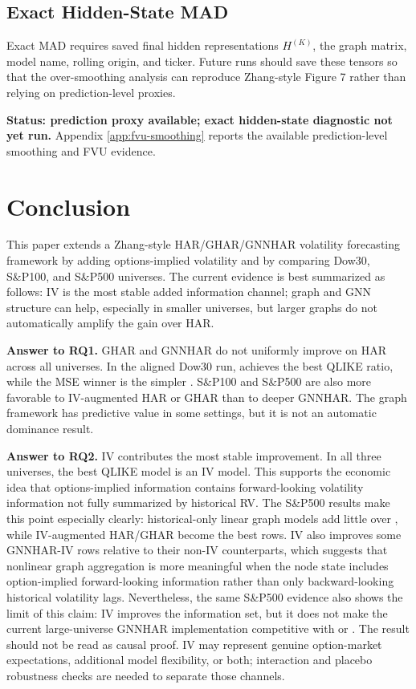 \documentclass[11pt,a4paper]{article}
\newcommand{\model}[1]{\texttt{\detokenize{#1}}}
\begin{document}
\subsection{Exact Hidden-State MAD}
\label{subsec:mad}

Exact MAD requires saved final hidden representations \(H^{(K)}\), the graph matrix, model name, rolling origin, and ticker.  Future runs should save these tensors so that the over-smoothing analysis can reproduce Zhang-style Figure 7 rather than relying on prediction-level proxies.

\textbf{Status: prediction proxy available; exact hidden-state diagnostic not yet run.}  Appendix \ref{app:fvu-smoothing} reports the available prediction-level smoothing and FVU evidence.

\section{Conclusion}
\label{sec:conclusion}

This paper extends a Zhang-style HAR/GHAR/GNNHAR volatility forecasting framework by adding options-implied volatility and by comparing Dow30, S\&P100, and S\&P500 universes.  The current evidence is best summarized as follows: IV is the most stable added information channel; graph and GNN structure can help, especially in smaller universes, but larger graphs do not automatically amplify the gain over HAR.

\textbf{Answer to RQ1.} GHAR and GNNHAR do not uniformly improve on HAR across all universes.  In the aligned Dow30 run, \model{GNNHAR2L_Q_IV} achieves the best QLIKE ratio, while the MSE winner is the simpler \model{HAR_M_IV}.  S\&P100 and S\&P500 are also more favorable to IV-augmented HAR or GHAR than to deeper GNNHAR.  The graph framework has predictive value in some settings, but it is not an automatic dominance result.

\textbf{Answer to RQ2.} IV contributes the most stable improvement.  In all three universes, the best QLIKE model is an IV model.  This supports the economic idea that options-implied information contains forward-looking volatility information not fully summarized by historical RV.  The S\&P500 results make this point especially clearly: historical-only linear graph models add little over \model{HAR_M}, while IV-augmented HAR/GHAR become the best rows.  IV also improves some GNNHAR-IV rows relative to their non-IV counterparts, which suggests that nonlinear graph aggregation is more meaningful when the node state includes option-implied forward-looking information rather than only backward-looking historical volatility lags.  Nevertheless, the same S\&P500 evidence also shows the limit of this claim: IV improves the information set, but it does not make the current large-universe GNNHAR implementation competitive with \model{HAR_M_IV} or \model{GHAR_M_IV}.  The result should not be read as causal proof.  IV may represent genuine option-market expectations, additional model flexibility, or both; interaction and placebo robustness checks are needed to separate those channels.
\end{document}
